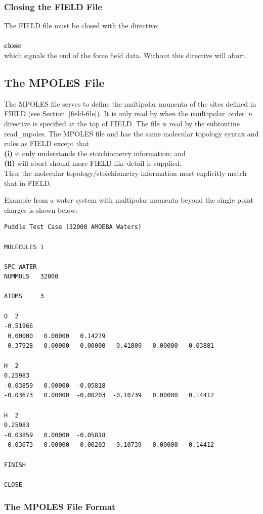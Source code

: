 \subsubsection{Closing the FIELD File}

The FIELD file must be closed with the directive:\\
\\
{\bf close}
\\
\noindent which signals the end of the force field data.  Without
this directive \D will abort.

\subsection{The MPOLES File}
\label{mpoles-file}

The MPOLES file serves to define the multipolar momenta of the
sites defined in FIELD (see Section~\ref{field-file}).  It is
only read by \D when the \underline{{\bf mult}ipolar~order~{\em n}}
directive is specified at the top of FIELD.  The file is read
by the subroutine {\sc read\_mpoles}.  The MPOLES file and has
the same molecular topology syntax and rules as FIELD except that \\
{\bf (i)} it only understands the stoichiometry information; and \\
{\bf (ii)} will abort should more FIELD like detail is supplied.\\
Thus the molecular topology/stoichiometry information must
explicitly match that in FIELD.

Example from a water system with multipolar momenta beyond the
single point charges is shown below:
\begin{lstlisting}
Puddle Test Case (32000 AMOEBA Waters)

MOLECULES 1

SPC WATER
NUMMOLS   32000

ATOMS     3

O  2
-0.51966
 0.00000   0.00000   0.14279
 0.37928   0.00000   0.00000  -0.41809   0.00000   0.03881

H  2
0.25983
-0.03859   0.00000  -0.05818
-0.03673   0.00000  -0.00203  -0.10739   0.00000   0.14412

H  2
0.25983
-0.03859   0.00000  -0.05818
-0.03673   0.00000  -0.00203  -0.10739   0.00000   0.14412

FINISH

CLOSE
\end{lstlisting}

\subsubsection{The MPOLES File Format}

